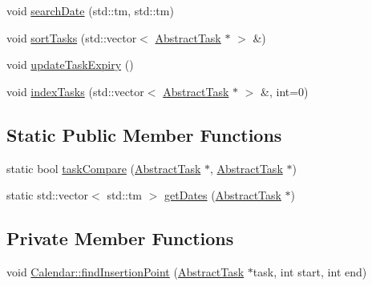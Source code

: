 \begin{DoxyCompactItemize}
void \hyperlink{class_do_lah_1_1_calendar_aaea96510180152ca13e24793b92f46c9}{search\+Date} (std\+::tm, std\+::tm)
\item 
void \hyperlink{class_do_lah_1_1_calendar_a4eebadb86c16cb33b00531c1523ce5e3}{sort\+Tasks} (std\+::vector$<$ \hyperlink{class_do_lah_1_1_abstract_task}{Abstract\+Task} $\ast$ $>$ \&)
\item 
void \hyperlink{class_do_lah_1_1_calendar_a7824820e868bcd25b13771aea3b1e03e}{update\+Task\+Expiry} ()
\item 
void \hyperlink{class_do_lah_1_1_calendar_a44a1a787d875cc3e8e67d261b8b097bc}{index\+Tasks} (std\+::vector$<$ \hyperlink{class_do_lah_1_1_abstract_task}{Abstract\+Task} $\ast$ $>$ \&, int=0)
\end{DoxyCompactItemize}
\subsection*{Static Public Member Functions}
\begin{DoxyCompactItemize}
\item 
static bool \hyperlink{class_do_lah_1_1_calendar_a7a0efe29e15b06b684b4069e9cd1c665}{task\+Compare} (\hyperlink{class_do_lah_1_1_abstract_task}{Abstract\+Task} $\ast$, \hyperlink{class_do_lah_1_1_abstract_task}{Abstract\+Task} $\ast$)
\item 
static std\+::vector$<$ std\+::tm $>$ \hyperlink{class_do_lah_1_1_calendar_a5cc616d7cf65a05871c0d399e8fae083}{get\+Dates} (\hyperlink{class_do_lah_1_1_abstract_task}{Abstract\+Task} $\ast$)
\end{DoxyCompactItemize}
\subsection*{Private Member Functions}
\begin{DoxyCompactItemize}
\item 
void \hyperlink{class_do_lah_1_1_calendar_a824cb648003203e6fe2784955efbf078}{Calendar\+::find\+Insertion\+Point} (\hyperlink{class_do_lah_1_1_abstract_task}{Abstract\+Task} $\ast$task, int start, int end)
\end{DoxyCompactItemize}
